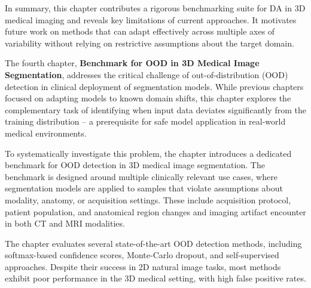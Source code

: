 In summary, this chapter contributes a rigorous benchmarking suite for DA in 3D medical imaging and reveals key limitations of current approaches. It motivates future work on methods that can adapt effectively across multiple axes of variability without relying on restrictive assumptions about the target domain.




The fourth chapter, \textbf{Benchmark for OOD in 3D Medical Image Segmentation}, addresses the critical challenge of out-of-distribution (OOD) detection in clinical deployment of segmentation models. While previous chapters focused on adapting models to known domain shifts, this chapter explores the complementary task of identifying when input data deviates significantly from the training distribution -- a prerequisite for safe model application in real-world medical environments.

To systematically investigate this problem, the chapter introduces a dedicated benchmark for OOD detection in 3D medical image segmentation. The benchmark is designed around multiple clinically relevant use cases, where segmentation models are applied to samples that violate assumptions about modality, anatomy, or acquisition settings. These include acquisition protocol, patient population, and anatomical region changes and imaging artifact encounter in both CT and MRI modalities.


%

The chapter evaluates several state-of-the-art OOD detection methods, including softmax-based confidence scores, Monte-Carlo dropout, and self-supervised approaches. Despite their success in 2D natural image tasks, most methods exhibit poor performance in the 3D medical setting, with high false positive rates.%

